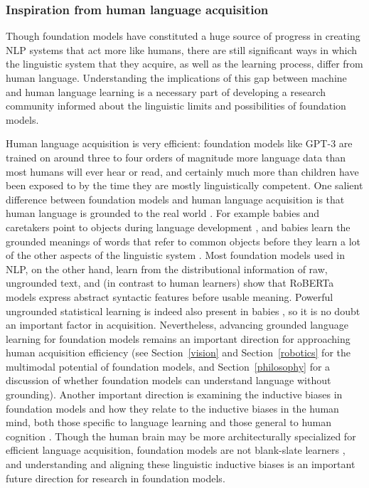 \subsubsection{Inspiration from human language acquisition}

Though foundation models have constituted a huge source of progress in creating NLP systems that act more like humans, there are still significant ways in which the linguistic system that they acquire, as well as the learning process, differ from human language. Understanding the implications of this gap between machine and human language learning is a necessary part of developing a research community informed about the linguistic limits and possibilities of foundation models.

Human language acquisition is very efficient: foundation models like GPT-3 are trained on around three to four orders of magnitude more language data than most humans will ever hear or read, and certainly much more than children have been exposed to by the time they are mostly linguistically competent. One salient difference between foundation models and human language acquisition is that human language is grounded to the real world \citep{saxton17child}. For example babies and caretakers point to objects during language development \citep{colonnesi2010relation}, and babies learn the grounded meanings of words that refer to common objects before they learn a lot of the other aspects of the linguistic system \citep{bergelson20126}. Most foundation models used in NLP, on the other hand, learn from the distributional information of raw, ungrounded text, and (in contrast to human learners) \citet{zhang2021billions} show that RoBERTa models express abstract syntactic features before usable meaning. Powerful ungrounded statistical learning is indeed also present in babies \citep{saffran1996statistical}, so it is no doubt an important factor in acquisition. Nevertheless, advancing grounded language learning for foundation models remains an important direction for approaching human acquisition efficiency
\citep[\textit{inter alia}]{dupoux2018cognitive, tan2020vokenization, zellers2021piglet} (see Section~\ref{vision} and Section~\ref{robotics} for the multimodal potential of foundation models, and Section~\ref{philosophy} for a discussion of whether foundation models can understand language without grounding). Another important direction is examining the inductive biases in foundation models and how they relate to the inductive biases in the human mind, both those specific to language learning and those general to human cognition \citep{linzen2021syntactic}. Though the human brain may be more architecturally specialized for efficient language acquisition, foundation models are not blank-slate learners \cite{baroni2021proper}, and understanding and aligning these linguistic inductive biases is an important future direction for research in foundation models. 


